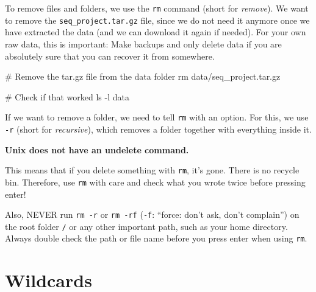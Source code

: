 \documentclass[
  letterpaper,
  DIV=11,
  numbers=noendperiod]{scrreprt}
\newenvironment{Shaded}{}{}
\newcommand{\AttributeTok}[1]{\textcolor[rgb]{0.84,0.23,0.29}{#1}}
\newcommand{\CommentTok}[1]{\textcolor[rgb]{0.42,0.45,0.49}{#1}}
\newcommand{\FunctionTok}[1]{\textcolor[rgb]{0.44,0.26,0.76}{#1}}
\newcommand{\NormalTok}[1]{\textcolor[rgb]{0.14,0.16,0.18}{#1}}
\begin{document}
To remove files and folders, we use the \texttt{rm} command (short for
\emph{remove}). We want to remove the \texttt{seq\_project.tar.gz} file,
since we do not need it anymore once we have extracted the data (and we
can download it again if needed). For your own raw data, this is
important: Make backups and only delete data if you are absolutely sure
that you can recover it from somewhere.

\begin{Shaded}
\begin{Highlighting}[]
\CommentTok{\# Remove the tar.gz file from the data folder}
\FunctionTok{rm}\NormalTok{ data/seq\_project.tar.gz}

\CommentTok{\# Check if that worked}
\FunctionTok{ls} \AttributeTok{{-}l}\NormalTok{ data}
\end{Highlighting}
\end{Shaded}

If we want to remove a folder, we need to tell \texttt{rm} with an
option. For this, we use \texttt{-r} (short for \emph{recursive}), which
removes a folder together with everything inside it.

\begin{tcolorbox}[enhanced jigsaw, coltitle=black, breakable, titlerule=0mm, colback=white, rightrule=.15mm, bottomrule=.15mm, toprule=.15mm, colframe=quarto-callout-important-color-frame, colbacktitle=quarto-callout-important-color!10!white, bottomtitle=1mm, opacitybacktitle=0.6, toptitle=1mm, leftrule=.75mm, arc=.35mm, title=\textcolor{quarto-callout-important-color}{\faExclamation}\hspace{0.5em}{Important}, left=2mm, opacityback=0]

\textbf{Unix does not have an undelete command.}

This means that if you delete something with \texttt{rm}, it's gone.
There is no recycle bin. Therefore, use \texttt{rm} with care and check
what you wrote twice before pressing enter!

Also, NEVER run \texttt{rm\ -r} or \texttt{rm\ -rf} (\texttt{-f}:
``force: don't ask, don't complain'') on the root folder \texttt{/} or
any other important path, such as your home directory. Always double
check the path or file name before you press enter when using
\texttt{rm}.

\end{tcolorbox}

\section{Wildcards}\label{wildcards}
\end{document}
